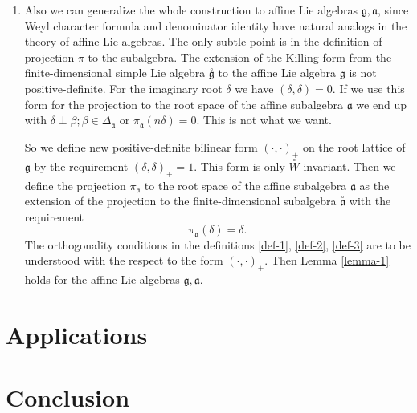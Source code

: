 \documentclass[12pt]{article}
\theoremstyle{definition}
\newcommand{\co}[1]{\stackrel{\circ }{#1}}
\newcommand{\gf}{\mathfrak{g}}
\newcommand{\af}{\mathfrak{a}}
\begin{document}
\begin{enumerate}
\item Also we can generalize the whole construction to affine Lie algebras $\gf, \af$, since Weyl character formula and denominator identity have natural analogs in the theory of affine Lie algebras. The only subtle point is in the definition of projection $\pi$ to the subalgebra. The extension of the Killing form from the finite-dimensional simple Lie algebra $\co{\gf}$ to the affine Lie algebra $\gf$ is not positive-definite. For the imaginary root $\delta$ we have $(\delta,\delta)=0$. If we use this form for the projection to the root space of the affine subalgebra $\af$ we end up with $\delta\perp \beta; \beta\in \Delta_{\af}$ or $\pi_{\af}(n\delta)=0$. This is not what we want. 

So we define new positive-definite bilinear form $(\cdot,\cdot)_+$ on the root lattice of $\gf$ by the requirement $(\delta,\delta)_+=1$. This form is only $\co{W}$-invariant. Then we define the projection $\pi_{\af}$ to the root space of the affine subalgebra $\af$ as the extension of the projection to the finite-dimensional subalgebra $\co{\af}$ with the requirement
\begin{equation}
  \label{eq:16}
  \pi_{\af}(\delta)=\delta.
\end{equation}
The orthogonality conditions in the definitions \ref{def-1}, \ref{def-2}, \ref{def-3} are to be understood with the respect to the form $(\cdot,\cdot)_+$. Then Lemma \ref{lemma-1} holds for the affine Lie algebras $\gf, \af$.
\end{enumerate}

\section{Applications}
\label{sec:applications}

\section{Conclusion}
\label{sec:conclusion}



{}

\end{document}
